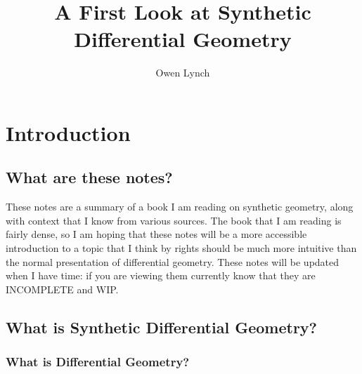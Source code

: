 \documentclass[]{book}
\title{A First Look at Synthetic Differential Geometry}
\author{Owen Lynch}
\date{}
\begin{document}
\maketitle

{
  \setcounter{tocdepth}{1}
  \tableofcontents
}

\chapter{Introduction}

\section{What are these notes?}

These notes are a summary of a book I am reading on synthetic geometry, along with context that I know from various sources. The book that I am reading is fairly dense, so I am hoping that these notes will be a more accessible introduction to a topic that I think by rights should be much more intuitive than the normal presentation of differential geometry.  These notes will be updated when I have time: if you are viewing them currently know that they are INCOMPLETE and WIP.

\section{What is Synthetic Differential Geometry?}

\subsection{What is Differential Geometry?}
\end{document}
